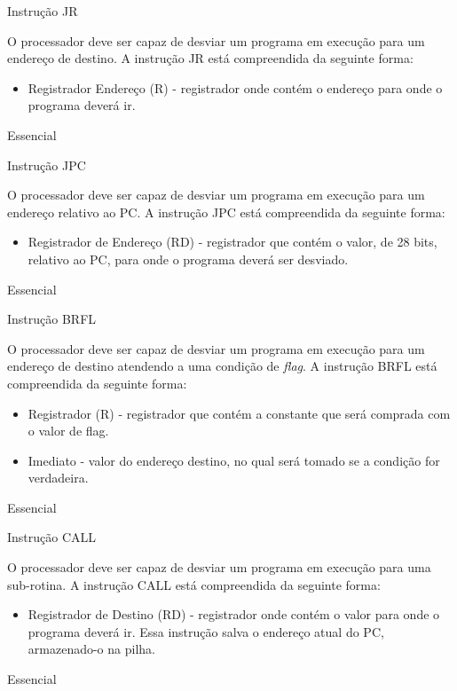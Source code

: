 \documentclass{article}
\begin{document}
    \begin{functional}
      \requirement
      {Instrução JR}
      {O processador deve ser capaz de desviar um programa em execução para um endereço de destino.
      A instrução JR está compreendida da seguinte forma:\\
       \begin{itemize}
         \item Registrador Endereço (R) - registrador onde contém o endereço para onde o programa deverá ir.
         \end{itemize}
         }
      {Essencial}

      \requirement
      {Instrução JPC}
      {O processador deve ser capaz de desviar um programa em execução para um endereço relativo ao PC.
      A instrução JPC está compreendida da seguinte forma:\\
       \begin{itemize}
         \item Registrador de Endereço (RD) - registrador que contém o valor, de 28 bits, relativo ao PC, para onde o programa deverá ser desviado.
         \end{itemize}
         }
      {Essencial}

      \requirement
      {Instrução BRFL}
      {O processador deve ser capaz de desviar um programa em execução para um endereço de destino atendendo a uma condição de \textit{flag}.
      A instrução BRFL está compreendida da seguinte forma:\\
       \begin{itemize}
         \item Registrador (R) - registrador que contém a constante que será comprada com o valor de flag.
         \item Imediato - valor do endereço destino, no qual será tomado se a condição for verdadeira.
         \end{itemize}
         }
      {Essencial}

      \requirement
      {Instrução CALL}
      {O processador deve ser capaz de desviar um programa em execução para uma sub-rotina.
      A instrução CALL está compreendida da seguinte forma:\\
       \begin{itemize}
         \item Registrador de Destino (RD) - registrador onde contém o valor para onde o programa deverá ir. Essa instrução salva o endereço atual do PC, armazenado-o na pilha.
        \end{itemize}
        }
      {Essencial}


\end{functional}
\end{document}
